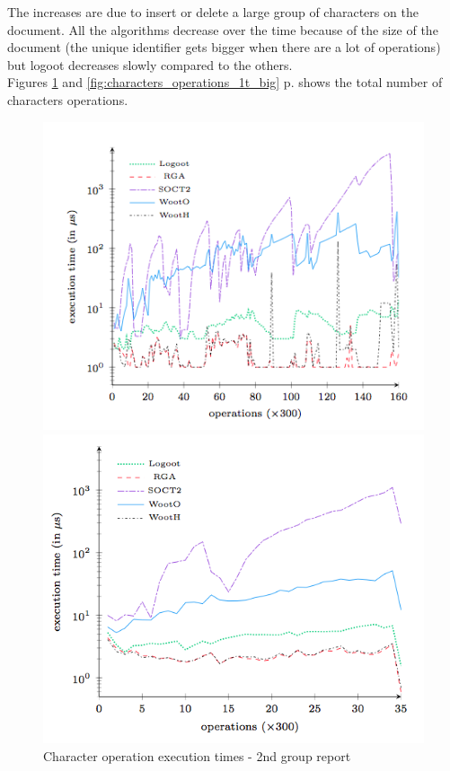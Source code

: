 The increases are due to insert or delete a large group of characters on the document. All the algorithms decrease over the time because of the size of the document (the unique identifier gets bigger when there are a lot of operations) but logoot decreases slowly compared to the others.\\

Figures \ref{fig:characters_operations_2g_report} and \ref{fig:characters_operations_1t_big} p.\pageref{fig:characters_operations_2g_report} shows the total number of characters operations.\\

\begin{figure}[h!]
\begin{minipage}{0.50\linewidth}
\includegraphics[width=1.1\textwidth]{includes/characters_operations_2g_report.png}
  \caption{Character operation execution times - 2nd
group report}
  \label{fig:characters_operations_2g_report}
  \end{minipage} \hfill
  \begin{minipage}{.50\linewidth}
\includegraphics[width=1.1\textwidth]{includes/characters_operations_1t_big.png}

\end{minipage}
\end{figure}
